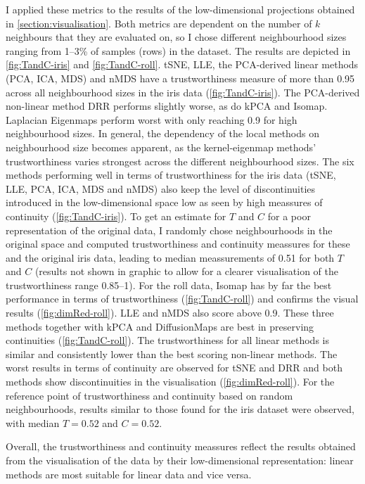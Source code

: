 I applied these metrics to the results of the low-dimensional projections obtained in \cref{section:visualisation}. Both metrics are dependent on the number of \(k\) neighbours that they are evaluated on, so I chose different neighbourhood sizes ranging from \numrange{1}{3}\% of samples (rows) in the dataset. The results are depicted in \cref{fig:TandC-iris} and \cref{fig:TandC-roll}. tSNE, LLE, the PCA-derived linear methods (PCA, ICA, MDS) and nMDS have a trustworthiness measure of more than \num{0.95} across all neighbourhood sizes in the iris data (\cref{fig:TandC-iris}). The PCA-derived non-linear method DRR performs slightly worse, as do kPCA and Isomap. Laplacian Eigenmaps perform worst with only reaching \num{0.9} for high neighbourhood sizes. In general, the dependency of the local methods on neighbourhood size becomes apparent, as the kernel-eigenmap methods' trustworthiness varies strongest across the different neighbourhood sizes. The six methods performing well in terms of trustworthiness for the iris data (tSNE, LLE, PCA, ICA, MDS and nMDS) also keep the level of discontinuities introduced in the low-dimensional space low as seen by high meassures of continuity (\cref{fig:TandC-iris}). To get an estimate for \(T\) and \(C\) for a poor representation of the original data, I randomly chose neighbourhoods in the original space and computed trustworthiness and continuity meassures for these and the original iris data, leading to median meassurements of \num{0.51} for both \(T\) and \(C\) (results not shown in graphic to allow for a clearer visualisation of the trustworthiness range \numrange{0.85}{1}).  For the roll data, Isomap has by far the best performance in terms of trustworthiness (\cref{fig:TandC-roll}) and confirms the visual results (\cref{fig:dimRed-roll}). LLE and nMDS also score above \num{0.9}. These three methods together with kPCA and DiffusionMaps are best in preserving continuities (\cref{fig:TandC-roll}). The trustworthiness for all linear methods is similar and consistently lower than the best scoring non-linear methods. The worst results in terms of continuity are observed for tSNE and DRR and both methods show discontinuities in the visualisation (\cref{fig:dimRed-roll}).  For the reference point of trustworthiness and continuity based on random neighbourhoods, results similar to those found for the iris dataset were observed, with median \(T=0.52\) and \(C=0.52\).

Overall, the trustworthiness and continuity meassures reflect the results obtained from the visualisation of the data by their low-dimensional representation: linear methods are most suitable for linear data and vice versa. 

